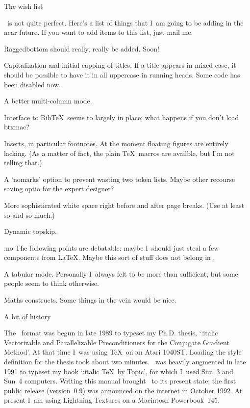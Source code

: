  The wish list

\Lollipop\ is not quite perfect. Here's a list of things that I~am
going to be adding in the near future. If you want to add items to
this list, just mail me.

\Enumerate\item Raggedbottom should really, really be added. Soon!

\item Capitalization and initial capping of titles. If a
title appears in mixed case, it should be possible to have it in all
uppercase in running heads. Some code has been disabled now.

\item A better multi-column mode.

\item Interface to Bib\TeX\ seems to largely in place; what happens
if you don't load btxmac?

\item Inserts, in particular footnotes. At the moment floating
figures are entirely lacking. (As a matter of fact, the plain \TeX\
macros are availble, but I'm not telling that.)

\item A `nomarks' option to prevent wasting two token lists.
Maybe other recourse saving optio for the expert designer?

\item More sophisticated white space right before and after
page breaks. (Use at least so and so much.)

\item Dynamic topskip.

{\PopIndentLevel\Indent:no The following points are debatable:
maybe I~should just steal a few components from \LaTeX. Maybe this
sort of stuff does not belong in \Lollipop.\par}

\item A tabular mode. Personally I~always felt  to be more
than sufficient, but some people seem to think otherwise.

\item Maths constructs. Some things in the  vein would be
nice.

\>

\SubSection A bit of history

The \Lollipop\ format was begun in late 1989 to typeset my Ph.D.
thesis, `{\Style:italic Vectorizable and Parallelizable
Preconditioners for the Conjugate Gradient Method}'. At that time 
I~was using \TeX\ on an Atari 1040ST.
Loading the style definition for the thesis took about two minutes.
\Lollipop\ was heavily augmented in late 1991 to typeset my book
`{\Style:italic \TeX\ by Topic}', for which I~used Sun~3 and Sun~4
computers. Writing this manual brought \Lollipop\ to its present
state; the first public release (version~0.9) was announced on the
internet in October 1992. At present I~am using Lightning Textures on a
Macintosh Powerbook~145.

